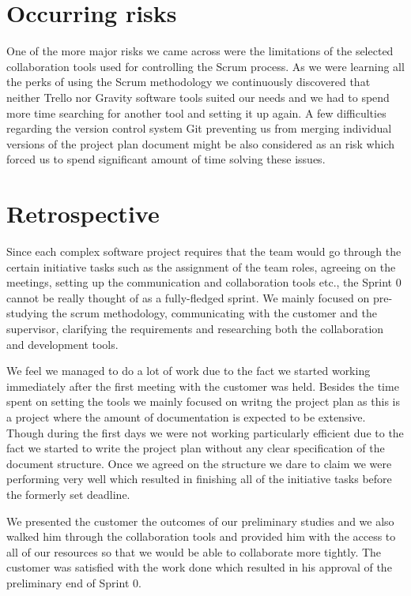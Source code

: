 \section{Occurring risks}

One of the more major risks we came across were the limitations of the selected collaboration tools used for controlling the Scrum process. As we were learning all the perks of using the Scrum methodology we continuously discovered that neither Trello nor Gravity software tools suited our needs and we had to spend more time searching for another tool and setting it up again. A few difficulties regarding the version control system Git preventing us from merging individual versions of the project plan document might be also considered as an risk which forced us to spend significant amount of time solving these issues.

\section{Retrospective}

Since each complex software project requires that the team would go through the certain initiative tasks such as the assignment of the team roles, agreeing on the meetings, setting up the communication and collaboration tools etc., the Sprint 0 cannot be really thought of as a fully-fledged sprint. We mainly focused on pre-studying the scrum methodology, communicating with the customer and the supervisor, clarifying the requirements and researching both the collaboration and development tools.

We feel we managed to do a lot of work due to the fact we started working immediately after the first meeting with the customer was held. Besides the time spent on setting the tools we mainly focused on writng the project plan as this is a project where the amount of documentation is expected to be extensive. Though during the first days we were not working particularly efficient due to the fact we started to write the project plan without any clear specification of the document structure. Once we agreed on the structure we dare to claim we were performing very well which resulted in finishing all of the initiative tasks before the formerly set deadline.

We presented the customer the outcomes of our preliminary studies and we also walked him through the collaboration tools and provided him with the access to all of our resources so that we would be able to collaborate more tightly. The customer was satisfied with the work done which resulted in his approval of the preliminary end of Sprint 0.

